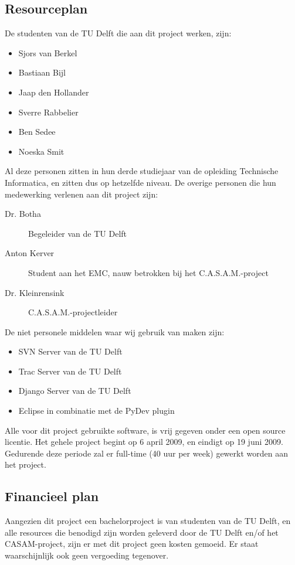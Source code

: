 \subsection{Resourceplan}
De studenten van de TU Delft die aan dit project werken, zijn:
\begin{itemize}
	\item Sjors van Berkel
	\item Bastiaan Bijl
	\item Jaap den Hollander
	\item Sverre Rabbelier
	\item Ben Sedee
	\item Noeska Smit
\end{itemize}
Al deze personen zitten in hun derde studiejaar van de opleiding Technische Informatica, en zitten dus op hetzelfde niveau. 
De overige personen die hun medewerking verlenen aan dit project zijn:
\begin{description}
	\item[Dr. Botha] Begeleider van de TU Delft
	\item[Anton Kerver] Student aan het EMC, nauw betrokken bij het C.A.S.A.M.-project
	\item[Dr. Kleinrensink] C.A.S.A.M.-projectleider
\end{description}
De niet personele middelen waar wij gebruik van maken zijn:
\begin{itemize}
	\item SVN Server van de TU Delft
	\item Trac Server van de TU Delft
	\item Django Server van de TU Delft
	\item Eclipse in combinatie met de PyDev plugin
\end{itemize}
Alle voor dit project gebruikte software, is vrij gegeven onder een open source licentie.
Het gehele project begint op 6 april 2009, en eindigt op 19 juni 2009. 
Gedurende deze periode zal er full-time (40 uur per week) gewerkt worden aan het project.


\subsection{Financieel plan}
Aangezien dit project een bachelorproject is van studenten van de TU Delft, en alle resources die benodigd zijn worden geleverd door de TU Delft en/of het CASAM-project, zijn er met dit project geen kosten gemoeid. Er staat waarschijnlijk ook geen vergoeding tegenover.
